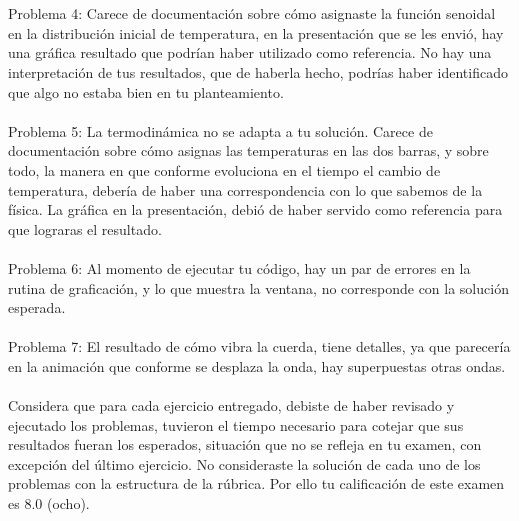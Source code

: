 \documentclass[letterpaper]{article}
\begin{document}
\\
\\
Problema 4: Carece de documentación sobre cómo asignaste la función senoidal en la distribución inicial de temperatura, en la presentación que se les envió, hay una gráfica resultado que podrían haber utilizado como referencia. No hay una interpretación de tus resultados, que de haberla hecho, podrías haber identificado que algo no estaba bien en tu planteamiento.
\\
\\
Problema 5: La termodinámica no se adapta a tu solución. Carece de documentación sobre cómo asignas las temperaturas en las dos barras, y sobre todo, la manera en que conforme evoluciona en el tiempo el cambio de temperatura, debería de haber una correspondencia con lo que sabemos de la física. La gráfica en la presentación, debió de haber servido como referencia para que lograras el resultado.
\\
\\
Problema 6: Al momento de ejecutar tu código, hay un par de errores en la rutina de graficación, y lo que muestra la ventana, no corresponde con la solución esperada.
\\
\\
Problema 7: El resultado de cómo vibra la cuerda, tiene detalles, ya que parecería en la animación que conforme se desplaza la onda, hay superpuestas otras ondas.
\\
\\
Considera que para cada ejercicio entregado, debiste de haber revisado y ejecutado los problemas, tuvieron el tiempo necesario para cotejar que sus resultados fueran los esperados, situación que no se refleja en tu examen, con excepción del último ejercicio. No consideraste la solución de cada uno de los problemas con la estructura de la rúbrica. Por ello tu calificación de este examen es 8.0 (ocho).

\end{document}
